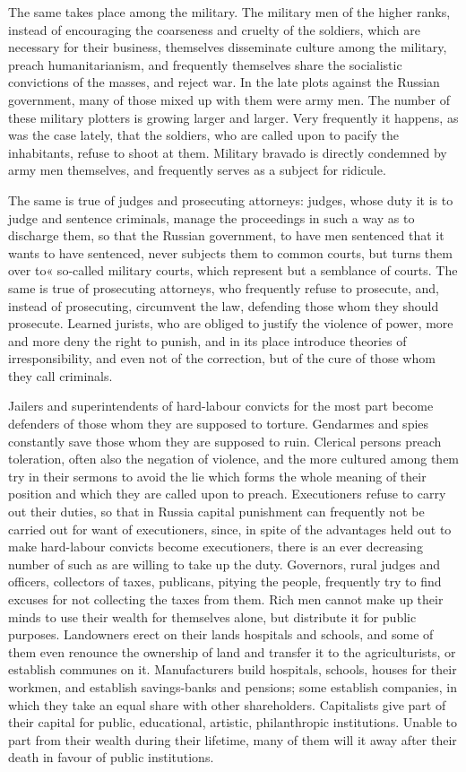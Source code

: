 \documentclass{book}
\begin{document}
The same takes place among the military. The military men of the higher ranks, instead of encouraging the coarseness and cruelty of the soldiers, which are necessary for their business, themselves disseminate culture among the military, preach humanitarianism, and frequently themselves share the socialistic convictions of the masses, and reject war. In the late plots against the Russian government, many of those mixed up with them were army men. The number of these military plotters is growing larger and larger. Very frequently it happens, as was the case lately, that the soldiers, who are called upon to pacify the inhabitants, refuse to shoot at them. Military bravado is directly condemned by army men themselves, and frequently serves as a subject for ridicule.

The same is true of judges and prosecuting attorneys: judges, whose duty it is to judge and sentence criminals, manage the proceedings in such a way as to discharge them, so that the Russian government, to have men sentenced that it wants to have sentenced, never subjects them to common courts, but turns them over to« so-called military courts, which represent but a semblance of courts. The same is true of prosecuting attorneys, who frequently refuse to prosecute, and, instead of prosecuting, circumvent the law, defending those whom they should prosecute. Learned jurists, who are obliged to justify the violence of power, more and more deny the right to punish, and in its place introduce theories of irresponsibility, and even not of the correction, but of the cure of those whom they call criminals.

Jailers and superintendents of hard-labour convicts for the most part become defenders of those whom they are supposed to torture. Gendarmes and spies constantly save those whom they are supposed to ruin. Clerical persons preach toleration, often also the negation of violence, and the more cultured among them try in their sermons to avoid the lie which forms the whole meaning of their position and which they are called upon to preach. Executioners refuse to carry out their duties, so that in Russia capital punishment can frequently not be carried out for want of executioners, since, in spite of the advantages held out to make hard-labour convicts become executioners, there is an ever decreasing number of such as are willing to take up the duty. Governors, rural judges and officers, collectors of taxes, publicans, pitying the people, frequently try to find excuses for not collecting the taxes from them. Rich men cannot make up their minds to use their wealth for themselves alone, but distribute it for public purposes. Landowners erect on their lands hospitals and schools, and some of them even renounce the ownership of land and transfer it to the agriculturists, or establish communes on it. Manufacturers build hospitals, schools, houses for their workmen, and establish savings-banks and pensions; some establish companies, in which they take an equal share with other shareholders. Capitalists give part of their capital for public, educational, artistic, philanthropic institutions. Unable to part from their wealth during their lifetime, many of them will it away after their death in favour of public institutions.
\end{document}
